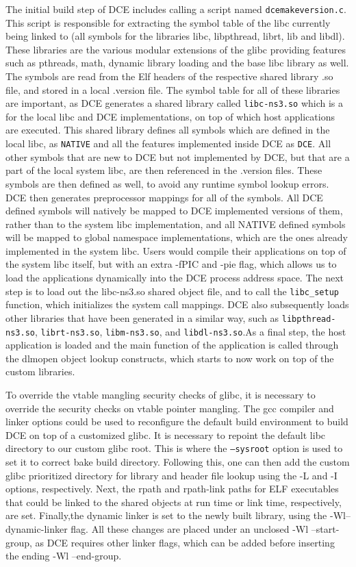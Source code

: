 \documentclass{sig-alternate}
\begin{document}
The initial build step of DCE includes calling a script named \texttt{dcemakeversion.c}. This script is responsible 
for extracting the symbol table of the libc currently being linked to (all symbols for the libraries libc, libpthread, librt, lib and libdl). These 
libraries are the various modular extensions of the glibc providing features such as pthreads, math, dynamic library loading and the base libc 
library as well. The symbols are read from the Elf headers of the respective shared library .so file, and stored in a local .version file.
The symbol table for all of these libraries are important, as DCE generates a shared library called \texttt{libc-ns3.so} which is a 
for the local libc and DCE implementations, on top of which host applications are executed. This shared library defines 
all symbols which are defined in the local libc, as \texttt{NATIVE} and all the features implemented inside DCE as \texttt{DCE}. All other symbols that are new to 
DCE but not implemented by DCE, but that are a part of the local system libc, are then referenced in the .version files.  These symbols are then defined 
as well, to avoid any runtime symbol lookup errors. DCE then generates preprocessor mappings for all of the symbols. All DCE defined symbols will 
natively be mapped to DCE implemented versions of them, rather than to the system libc implementation, and all NATIVE defined symbols will be mapped 
to global namespace implementations, which are the ones already implemented in the system libc. Users would compile their applications on top of 
the system libc itself, but with an extra -fPIC and -pie flag, which allows us to load the applications dynamically into the DCE process address 
space. The next step is to load out the libc-ns3.so shared object file, and to call the \texttt{libc\_setup} function, which initializes the system call mappings. 
DCE also subsequently loads other libraries that have been generated in a similar way, such as \texttt{libpthread-ns3.so}, \texttt{librt-ns3.so}, \texttt{libm-ns3.so}, 
and \texttt{libdl-ns3.so}.As a final step, the host application is loaded and the main function of the application is called through the dlmopen object lookup constructs, 
which starts to now work on top of the custom libraries.

To override the vtable mangling security checks of glibc, it is necessary to override the security checks on vtable pointer mangling. 
The gcc compiler and linker options could be used to 
reconfigure the default build environment to build DCE on top of a customized
glibc. It is necessary to repoint the default libc directory to our custom glibc root. This is where the \texttt{--sysroot} option 
is used to set it to correct bake build directory. Following this, one can then add the custom glibc prioritized directory for library and header file lookup using the 
-L and -I options, respectively. Next, the rpath and rpath-link paths for ELF executables that could be linked to the shared objects at run time 
or link time, respectively, are set. Finally,the dynamic linker is set to the newly built library, using the -Wl--dynamic-linker flag.  All these changes
are placed under an unclosed -Wl --start-group, as DCE requires other linker flags, which can be added before inserting the ending -Wl --end-group.
\end{document}
